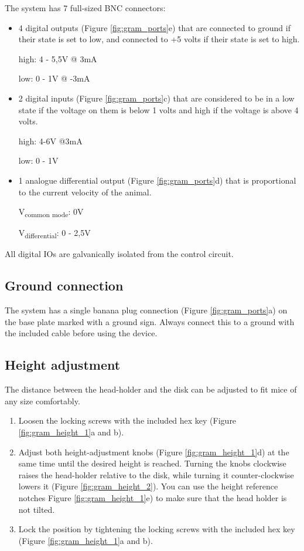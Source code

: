 \documentclass[11pt,a4paper]{article}
\begin{document}
The system has 7 full-sized BNC connectors:
\begin{itemize}
\item 4 digital outputs (Figure \ref{fig:gram_ports}e) that are connected to ground if their state is set to low, and connected to +5 volts if their state is set to high.

high: 4 - 5,5V @ 3mA

low:  0 - 1V   @ -3mA

\item 2 digital inputs  (Figure \ref{fig:gram_ports}c) that are considered to be in a low state if the voltage on them is below 1 volts and high if the voltage is above 4 volts. 

high: 4-6V @3mA

low:  0 - 1V


\item 1 analogue differential output (Figure \ref{fig:gram_ports}d) that is proportional to the current velocity of the animal.

V\textsubscript{common mode}:  0V

V\textsubscript{differential}: 0 - 2,5V
\end{itemize}
All digital IOs are galvanically isolated from the control circuit.

\subsection{Ground connection}
The system has a single banana plug connection (Figure \ref{fig:gram_ports}a) on the base plate marked with a ground sign. Always connect this to a ground with the included cable before using the device.

\subsection{Height adjustment \label{sec:height_adjust}}
The distance between the head-holder and the disk can be adjusted to fit mice of any size comfortably.
\begin{enumerate}
\item Loosen the locking screws with the included hex key (Figure \ref{fig:gram_height_1}a and b).
\item Adjust both height-adjustment knobs (Figure \ref{fig:gram_height_1}d) at the same time until the desired height is reached. Turning the knobs clockwise raises the head-holder relative to the disk, while turning it counter-clockwise lowers it (Figure \ref{fig:gram_height_2}). You can use the height reference notches Figure \ref{fig:gram_height_1}e) to make sure that the head holder is not tilted.
\item Lock the position by tightening the locking screws with the included hex key (Figure \ref{fig:gram_height_1}a and b).
\end{enumerate}
\end{document}
